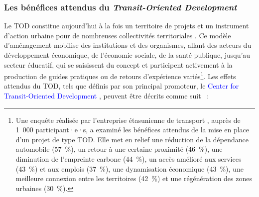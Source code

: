 \begin{refsegment}
\subsubsection*{Les bénéfices attendus du \textsl{Transit-Oriented Development}
    \label{chap1:tod-presentation-generale-definition-effets-attendus}
    }

Le \acrshort{TOD} constitue aujourd’hui à la fois un territoire de projets et un instrument d’action urbaine pour de nombreuses collectivités territoriales \textcolor{blue}{\autocite[23]{bentayou_transit-oriented_2015}}. Ce modèle d’aménagement mobilise des institutions et des organismes, allant des acteurs du développement économique, de l’économie sociale, de la santé publique, jusqu’au secteur éducatif, qui se saisissent du concept et participent activement à la production de guides pratiques ou de retours d’expérience variés\footnote{
    Une enquête réalisée par l'entreprise étasunienne de transport \textcolor{blue}{\textcite[9]{hntb_america_2016}}, auprès de 1~000 participant·e·s, a examiné les bénéfices attendus de la mise en place d'un projet de type \acrshort{TOD}. Elle met en relief une réduction de la dépendance automobile (57~\%), un retour à une certaine proximité (46~\%), une diminution de l'empreinte carbone (44~\%), un accès amélioré aux services (43~\%) et aux emplois (37~\%), une dynamisation économique (43~\%), une meilleure connexion entre les territoires (42~\%) et une régénération des zones urbaines (30~\%).
}. Les effets attendus du \acrshort{TOD}, tels que définis par son principal promoteur, le \textcolor{blue}{Center for Transit-Oriented Development} \textcolor{blue}{\autocites[35-39]{ohland_communicating_2006}[11-21]{noland_measuring_2014}}, peuvent être décrits comme suit \textcolor{blue}{\autocites[11]{bentayou_transit-oriented_2015}[114-122]{ibraeva_transit-oriented_2020}[5-11]{ali_dynamics_2021}[6-11]{wan_equity_2023}}~:

\end{refsegment}
